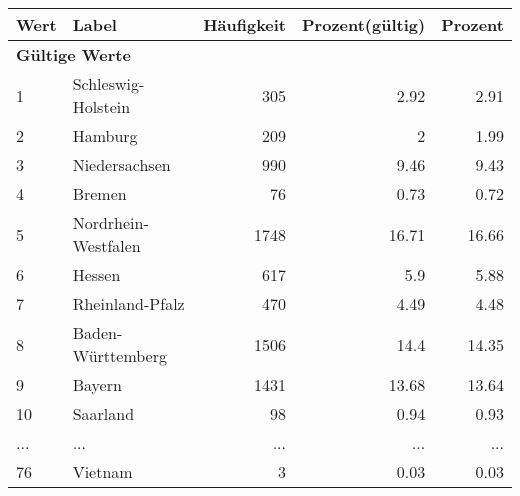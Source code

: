      \begin{longtable}{lXrrr}
     \toprule
     \textbf{Wert} & \textbf{Label} & \textbf{Häufigkeit} & \textbf{Prozent(gültig)} & \textbf{Prozent} \\
     \endhead
     \midrule
     \multicolumn{5}{l}{\textbf{Gültige Werte}}\\
        1 & \multicolumn{1}{X}{Schleswig-Holstein} & %
          \num{305} &
          \num[round-mode=places,round-precision=2]{2.92} &
          \num[round-mode=places,round-precision=2]{2.91} \\
        2 & \multicolumn{1}{X}{Hamburg} & %
          \num{209} &
          \num[round-mode=places,round-precision=2]{2} &
          \num[round-mode=places,round-precision=2]{1.99} \\
        3 & \multicolumn{1}{X}{Niedersachsen} & %
          \num{990} &
          \num[round-mode=places,round-precision=2]{9.46} &
          \num[round-mode=places,round-precision=2]{9.43} \\
        4 & \multicolumn{1}{X}{Bremen} & %
          \num{76} &
          \num[round-mode=places,round-precision=2]{0.73} &
          \num[round-mode=places,round-precision=2]{0.72} \\
        5 & \multicolumn{1}{X}{Nordrhein-Westfalen} & %
          \num{1748} &
          \num[round-mode=places,round-precision=2]{16.71} &
          \num[round-mode=places,round-precision=2]{16.66} \\
        6 & \multicolumn{1}{X}{Hessen} & %
          \num{617} &
          \num[round-mode=places,round-precision=2]{5.9} &
          \num[round-mode=places,round-precision=2]{5.88} \\
        7 & \multicolumn{1}{X}{Rheinland-Pfalz} & %
          \num{470} &
          \num[round-mode=places,round-precision=2]{4.49} &
          \num[round-mode=places,round-precision=2]{4.48} \\
        8 & \multicolumn{1}{X}{Baden-Württemberg} & %
          \num{1506} &
          \num[round-mode=places,round-precision=2]{14.4} &
          \num[round-mode=places,round-precision=2]{14.35} \\
        9 & \multicolumn{1}{X}{Bayern} & %
          \num{1431} &
          \num[round-mode=places,round-precision=2]{13.68} &
          \num[round-mode=places,round-precision=2]{13.64} \\
        10 & \multicolumn{1}{X}{Saarland} & %
          \num{98} &
          \num[round-mode=places,round-precision=2]{0.94} &
          \num[round-mode=places,round-precision=2]{0.93} \\
       ... & ... & ... & ... & ... \\
        76 & \multicolumn{1}{X}{Vietnam} & %
          \num{3} &
          \num[round-mode=places,round-precision=2]{0.03} &
          \num[round-mode=places,round-precision=2]{0.03} \\


\end{longtable}
